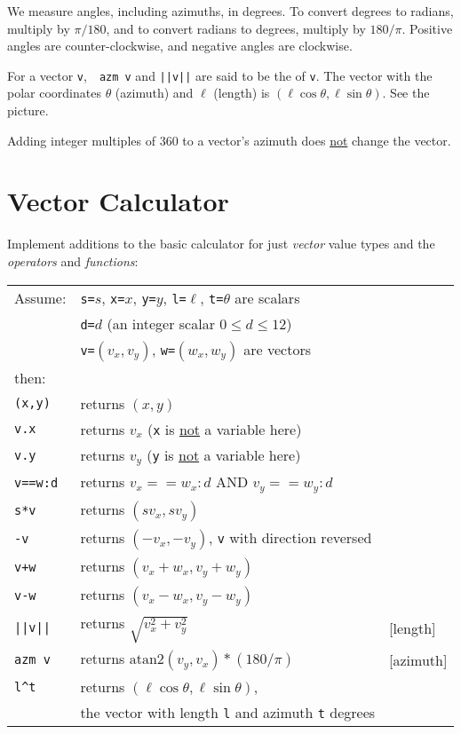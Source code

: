 \documentclass[12pt]{article}
\begin{document}
We measure angles, including azimuths, in degrees.  To convert degrees
to radians, multiply by $\pi/180$, and to convert radians to degrees,
multiply by $180/\pi$.  Positive angles are counter-clockwise, and
negative angles are clockwise.

For a vector {\tt v},~~{\tt azm v} and {\tt ||v||} are said to be
the  of {\tt v}.
The vector with the polar coordinates $\theta$ (azimuth) and $\ell$ (length) is
$(\ell \cos\theta,\ell \sin\theta)$.
See the picture.

Adding integer multiples of 360 to a vector's
azimuth does \underline{not} change the vector.

\newpage

\section{Vector Calculator}
Implement additions to the basic calculator for just {\em vector}
value types and the {\em operators} and {\em functions}:
\begin{center}
\begin{tabular}{l@{~~~~~}l@{~~~~~}l}
Assume: & {\tt s=}$s$, {\tt x=}$x$, {\tt y=$y$},
          {\tt l=$\ell$}, {\tt t=$\theta$}
          are scalars \\
	& {\tt d=}$d$ (an integer scalar $0\le d\le 12$) \\
	& {\tt v=}$(v_x,v_y)$, {\tt w=}$(w_x,w_y)$ are vectors \\
then: \\[1ex]
\tt (x,y) & returns $(x,y)$ \\
\tt v.x & returns $v_x$ ({\tt x} is \underline{not} a variable here) \\
\tt v.y & returns $v_y$ ({\tt y} is \underline{not} a variable here) \\
\tt v==w:d & returns $v_x==w_x:d$ AND $v_y==w_y:d$ \\
\tt s*v & returns $(s v_x, s v_y )$ \\
\tt -v & returns $( -v_x, -v_y )$, {\tt v} with direction reversed \\
\tt v+w & returns $(v_x + w_x, v_y + w_y)$ \\
\tt v-w & returns $(v_x - w_x, v_y - w_y)$ \\
\tt ||v|| & returns $\sqrt{v_x^2 + v_y^2}$ & [length] \\
\tt azm v & returns $\mathrm{atan2}(v_y,v_x)*(180/\pi)$ & [azimuth] \\
\tt l\textasciicircum t
          & returns $(\ell\cos\theta,\ell\sin\theta)$, \\
	  & the vector with length {\tt l} and azimuth {\tt t} degrees \\
\end{tabular}
\end{center}
\end{document}
